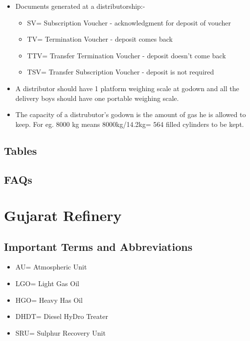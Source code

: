 \documentclass{report}
\begin{document}
\begin{itemize}
		\item Documents generated at a distributorship:-
		\begin{itemize}
			\item SV= Subscription Voucher - acknowledgment for deposit of voucher
			\item TV= Termination Voucher - deposit comes back
			\item TTV= Transfer Termination Voucher - deposit doesn't come back
			\item TSV= Transfer Subscription Voucher - deposit is not required
		\end{itemize}
		\item A distributor should have 1 platform weighing scale at godown and all the delivery boys should have one portable weighing scale.
		\item The capacity of a distrubutor's godown is the amount of gas he is allowed to keep. For eg. 8000 kg means 8000kg/14.2kg= 564 filled cylinders to be kept.
	\end{itemize}
	\section{Tables}
	\section{FAQs}
	\chapter{Gujarat Refinery}
	\section{Important Terms and Abbreviations}
	\begin{itemize}
		\item AU= Atmospheric Unit
		\item LGO= Light Gas Oil
		\item HGO= Heavy Has Oil
		\item DHDT= Diesel HyDro Treater
		\item SRU= Sulphur Recovery Unit
	\end{itemize}
\end{document}
